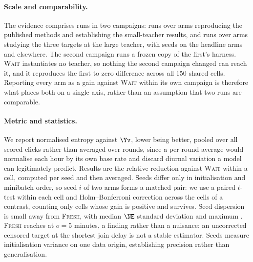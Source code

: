 \paragraph{Scale and comparability.} The evidence comprises \nRunsBoth{} runs in two campaigns:
\nRunsThree{} runs over \nArmsThree{} arms reproducing the published methods and establishing
the small-teacher results, and \nRunsFour{} runs over \nArmsFour{} arms studying the three
targets at the large teacher, with \seedsCore{} seeds on the headline arms and \seedsOther{}
elsewhere. The second campaign runs a frozen copy of the first's harness. \textsc{Wait}
instantiates no teacher, so nothing the second campaign changed can reach it, and it reproduces
the first to zero difference across all 150 shared cells. Reporting every arm as a gain against
\textsc{Wait} within its own campaign is therefore what places both on a single axis, rather
than an assumption that two runs are comparable.

\paragraph{Metric and statistics.} We report normalised entropy against $\Yv$, lower being
better, pooled over all scored clicks rather than averaged over rounds, since a per-round
average would normalise each hour by its own base rate and discard diurnal variation a model can
legitimately predict. Results are the relative reduction against \textsc{Wait} within a cell,
computed per seed and then averaged. Seeds differ only in initialisation and minibatch order, so
seed $i$ of two arms forms a matched pair: we use a paired $t$-test within each cell and
Holm--Bonferroni correction across the \nCells{} cells of a contrast, counting only cells whose
gain is positive and survives. Seed dispersion is small away from \textsc{Fresh}, with median
$\NE$ standard deviation \seedSdMed{} and maximum \seedSdMax{}. \textsc{Fresh} reaches
\seedSdFresh{} at $o=5$ minutes, a finding rather than a nuisance: an uncorrected censored
target at the shortest join delay is not a stable estimator. Seeds measure initialisation
variance on one data origin, establishing precision rather than generalisation.
